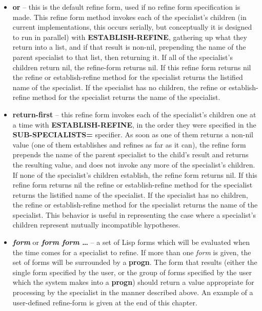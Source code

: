 \begin{itemize}
\item {\bf or} -- this is the default refine form, used if no refine form
specification is made. This refine form method invokes each of the
specialist's children (in current implementations, this occurs
serially, but conceptually it is designed to run in parallel) with
{\bf ESTABLISH-REFINE}, gathering up what they return into a list, and
if that result is non-nil, prepending the name of the parent
specialist to that list, then returning it. If all of the specialist's
children return nil, the refine-form returns nil.  If this refine form
returns nil the refine or establish-refine method for the specialist
returns the listified name of the specialist. If the specialist has no
children, the refine or establish-refine method for the specialist
returns the name of the specialist.

\item {\bf return-first} -- this refine form invokes each of the specialist's
children one at a time with {\bf ESTABLISH-REFINE}, in the order they
were specified in the {\bf SUB-SPECIALISTS=} specifier. As soon as one
of them returns a non-nil value (one of them establishes and refines
as far as it can), the refine form prepends the name of the parent
specialist to the child's result and returns the resulting value, and
does not invoke any more of the specialist's children. If none of the
specialist's children establish, the refine form returns nil.  If this
refine form returns nil the refine or establish-refine method for the
specialist returns the listified name of the specialist. If the
specialist has no children, the refine or establish-refine method for
the specialist returns the name of the specialist.  This behavior is
useful in representing the case where a specialist's children
represent mutually incompatible hypotheses.

\item {\bf {\it form\/}} or {\bf {\it form form} \ldots} --
a set of Lisp forms which will be evaluated when the time comes for a
specialist to refine. If more than one {\it form\/} is given, the set
of forms will be surrounded by a {\bf progn}. The form that results
(either the single form specified by the user, or the group of forms
specified by the user which the system makes into a {\bf progn})
should return a value appropriate for processing by the specialist in
the manner described above. An example of a user-defined refine-form
is given at the end of this chapter.
\end{itemize}


